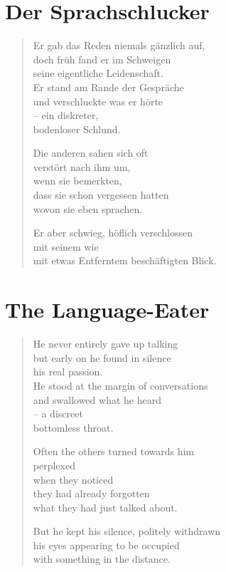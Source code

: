 
\cleartoverso

\section{Der Sprachschlucker}

\begin{verse}
Er gab das Reden niemals gänzlich auf,\\
doch früh fand er im Schweigen\\
seine eigentliche Leidenschaft.\\
Er stand am Rande der Gespräche\\
und verschluckte was er hörte\\
-- ein diskreter,\\
bodenloser Schlund.

Die anderen sahen sich oft\\
verstört nach ihm um,\\
wenn sie bemerkten,\\
dass sie schon vergessen hatten\\
wovon sie eben sprachen.

Er aber schwieg, höflich verschlossen\\
mit seinem wie\\
mit etwas Entferntem beschäftigten Blick.
\end{verse}

\cleartorecto

\section{The Language-Eater}

\begin{verse}
He never entirely gave up talking\\
but early on he found in silence\\
his real passion.\\
He stood at the margin of conversations\\
and swallowed what he heard\\
-- a discreet\\
bottomless throat.

Often the others turned towards him\\
perplexed\\
when they noticed\\
they had already forgotten\\
what they had just talked about.

But he kept his silence, politely withdrawn\\
his eyes appearing to be occupied\\
with something in the distance.
\end{verse}

